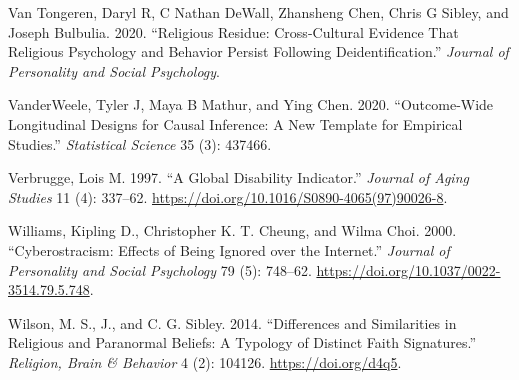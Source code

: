 \documentclass[
  letterpaper,
  DIV=11,
  numbers=noendperiod]{scrartcl}
\newlength{\cslhangindent}
\newlength{\cslentryspacingunit} %
\newenvironment{CSLReferences}[2] %
 {%
  \setlength{\parindent}{0pt}
  \ifodd #1
  \let\oldpar\par
  \def\par{\hangindent=\cslhangindent\oldpar}
  \fi
  \setlength{\parskip}{#2\cslentryspacingunit}
 }%
 {}
\begin{document}
\begin{CSLReferences}{1}{0}
\leavevmode{}%
Van Tongeren, Daryl R, C Nathan DeWall, Zhansheng Chen, Chris G Sibley,
and Joseph Bulbulia. 2020. {``Religious Residue: Cross-Cultural Evidence
That Religious Psychology and Behavior Persist Following
Deidentification.''} \emph{Journal of Personality and Social
Psychology}.

\leavevmode{}%
VanderWeele, Tyler J, Maya B Mathur, and Ying Chen. 2020.
{``Outcome-Wide Longitudinal Designs for Causal Inference: A New
Template for Empirical Studies.''} \emph{Statistical Science} 35 (3):
437466.

\leavevmode{}%
Verbrugge, Lois M. 1997. {``A Global Disability Indicator.''}
\emph{Journal of Aging Studies} 11 (4): 337--62.
\url{https://doi.org/10.1016/S0890-4065(97)90026-8}.

\leavevmode{}%
Williams, Kipling D., Christopher K. T. Cheung, and Wilma Choi. 2000.
{``Cyberostracism: Effects of Being Ignored over the Internet.''}
\emph{Journal of Personality and Social Psychology} 79 (5): 748--62.
\url{https://doi.org/10.1037/0022-3514.79.5.748}.

\leavevmode{}%
Wilson, M. S., J., and C. G. Sibley. 2014. {``Differences and
Similarities in Religious and Paranormal Beliefs: A Typology of Distinct
Faith Signatures.''} \emph{Religion, Brain \& Behavior} 4 (2): 104126.
\url{https://doi.org/d4q5}.

\end{CSLReferences}
\end{document}
